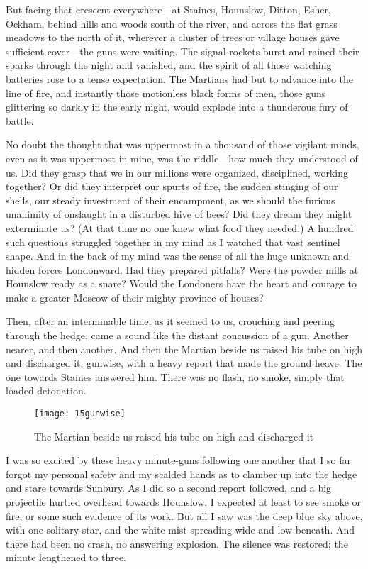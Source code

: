 But facing that crescent everywhere—at Staines, Hounslow, Ditton, Esher, Ockham, behind hills and woods south of the river, and across the flat grass meadows to the north of it, wherever a cluster of trees or village houses gave sufficient cover—the guns were waiting. The signal rockets burst and rained their sparks through the night and vanished, and the spirit of all those watching batteries rose to a tense expectation. The Martians had but to advance into the line of fire, and instantly those motionless black forms of men, those guns glittering so darkly in the early night, would explode into a thunderous fury of battle.



No doubt the thought that was uppermost in a thousand of those vigilant minds, even as it was uppermost in mine, was the riddle—how much they understood of us. Did they grasp that we in our millions were organized, disciplined, working together? Or did they interpret our spurts of fire, the sudden stinging of our shells, our steady investment of their encampment, as we should the furious unanimity of onslaught in a disturbed hive of bees? Did they dream they might exterminate us? (At that time no one knew what food they needed.) A hundred such questions struggled together in my mind as I watched that vast sentinel shape. And in the back of my mind was the sense of all the huge unknown and hidden forces Londonward. Had they prepared pitfalls? Were the powder mills at Hounslow ready as a snare? Would the Londoners have the heart and courage to make a greater Moscow of their mighty province of houses?

Then, after an interminable time, as it seemed to us, crouching and peering through the hedge, came a sound like the distant concussion of a gun. Another nearer, and then another. And then the Martian beside us raised his tube on high and discharged it, gunwise, with a heavy report that made the ground heave. The one towards Staines answered him. There was no flash, no smoke, simply that loaded detonation.

\begin{figure}[tbp]
\centering
\texttt{[image: 15gunwise]}
\caption{The Martian beside us raised his tube on high and discharged it}
\end{figure}

I was so excited by these heavy minute-guns following one another that I so far forgot my personal safety and my scalded hands as to clamber up into the hedge and stare towards Sunbury. As I did so a second report followed, and a big projectile hurtled overhead towards Hounslow. I expected at least to see smoke or fire, or some such evidence of its work. But all I saw was the deep blue sky above, with one solitary star, and the white mist spreading wide and low beneath. And there had been no crash, no answering explosion. The silence was restored; the minute lengthened to three.

